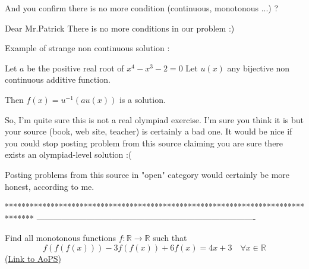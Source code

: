 


\begin{solution}
	\begin{tcolorbox}
And you confirm there is no more condition (continuous, monotonous ...) ?\end{tcolorbox}
Dear Mr.Patrick
There is no more conditions in our problem :)
\end{solution}



\begin{solution}
	Example of strange non continuous solution :

Let $a$ be the positive real root of $x^4-x^3-2=0$
Let $u(x)$ any bijective non continuous additive function.

Then $f(x)=u^{-1}(a u(x))$ is a solution.

So, I'm quite sure this is not a real olympiad exercise.
I'm sure you think it is but your source (book, web site, teacher) is certainly a bad one.
It would be nice if you could stop posting problem from this source claiming you are sure there exists an olympiad-level solution :(

Posting problems from this source in "open" category would certainly be more honest, according to me.
\end{solution}
*******************************************************************************
-------------------------------------------------------------------------------

\begin{problem}
	Find all monotonous functions $f: \mathbb R\to\mathbb R$  such that 
\[f (f (f (x)))-3f (f (x))+6f (x) = 4x +3  \quad \forall x\in\mathbb R\]
	\flushright \href{https://artofproblemsolving.com/community/c6h566575}{(Link to AoPS)}
\end{problem}



